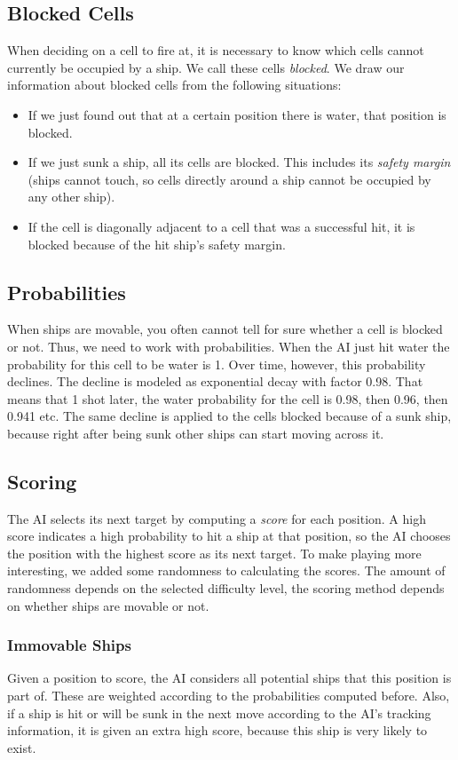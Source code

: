 \documentclass[a4paper]{easychair}
\begin{document}
\subsection{Blocked Cells}
When deciding on a cell to fire at, it is necessary to know which cells cannot currently be occupied by a ship. We call these cells \emph{blocked}. 
We draw our information about blocked cells from the following situations:
\begin{itemize}
 \item 
 If we just found out that at a certain position there is water, that position is blocked.
 \item
 If we just sunk a ship, all its cells are blocked. This includes its \emph{safety margin} (ships cannot touch, so cells directly around a ship cannot be occupied by any other ship).
 \item 
 If the cell is diagonally adjacent to a cell that was a successful hit, it is blocked because of the hit ship's safety margin.
\end{itemize}


\subsection{Probabilities}
When ships are movable, you often cannot tell for sure whether a cell is blocked or not. Thus, we need to work with probabilities. When the AI just hit water the probability for this cell to be water is 1. Over time, however, this probability declines. The decline is modeled as exponential decay with factor 0.98. That means that 1 shot later, the water probability for the cell is 0.98, then 0.96, then 0.941 etc. The same decline is applied to the cells blocked because of a sunk ship, because right after being sunk other ships can start moving across it.

\subsection{Scoring}
The AI selects its next target by computing a \emph{score} for each position. A high score indicates a high probability to hit a ship at that position, so the AI chooses the position with the highest score as its next target. To make playing more interesting, we added some randomness to calculating the scores. The amount of randomness depends on the selected difficulty level, the scoring method depends on whether ships are movable or not.

\subsubsection{Immovable Ships} Given a position to score, the AI considers all potential ships that this position is part of. These are weighted according to the probabilities computed before. Also, if a ship is hit or will be sunk in the next move according to the AI's tracking information, it is given an extra high score, because this ship is very likely to exist.
\end{document}
